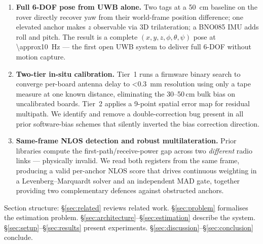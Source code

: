 \begin{enumerate}

  \item \textbf{Full 6-DOF pose from UWB alone.}
    Two tags at a \SI{50}{\centi\metre} baseline on the rover directly recover
    yaw from their world-frame position difference; one elevated anchor makes $z$
    observable via 3D trilateration; a BNO085 IMU adds roll and pitch.
    The result is a complete $(x,y,z,\phi,\theta,\psi)$ pose at \SI{\approx10}{\hertz}
    --- the first open UWB system to deliver full 6-DOF without motion capture.

  \item \textbf{Two-tier in-situ calibration.}
    Tier~1 runs a firmware binary search to converge per-board antenna delay to
    \SI{<0.3}{\milli\metre} resolution using only a tape measure at one known
    distance, eliminating the 30--50\,cm bulk bias on uncalibrated boards.
    Tier~2 applies a 9-point spatial error map for residual multipath.
    We identify and remove a double-correction bug present in all prior
    software-bias schemes that silently inverted the bias correction direction.

  \item \textbf{Same-frame NLOS detection and robust multilateration.}
    Prior libraries compute the first-path/receive-power gap across two
    \emph{different} radio links --- physically invalid.
    We read both registers from the same frame, producing a valid per-anchor
    NLOS score that drives continuous weighting in a Levenberg--Marquardt solver
    and an independent MAD gate, together providing two complementary defences
    against obstructed anchors.

\end{enumerate}

Section structure: \S\ref{sec:related} reviews related work.
\S\ref{sec:problem} formalises the estimation problem.
\S\ref{sec:architecture}--\S\ref{sec:estimation} describe the system.
\S\ref{sec:setup}--\S\ref{sec:results} present experiments.
\S\ref{sec:discussion}--\S\ref{sec:conclusion} conclude.
